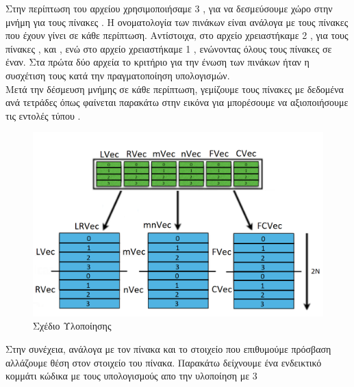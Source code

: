 \documentclass{article}
\begin{document}
Στην περίπτωση του αρχείου  χρησιμοποιήσαμε 3 , για να δεσμεύσουμε χώρο στην μνήμη για τους πίνακες . Η ονοματολογία των πινάκων είναι ανάλογα με τους πίνακες που έχουν γίνει  σε κάθε περίπτωση. Αντίστοιχα, στο αρχείο  χρειαστήκαμε 2 , για τους πίνακες , και , ενώ στο αρχείο  χρειαστήκαμε 1 , ενώνοντας όλους τους πίνακες σε έναν. Στα πρώτα δύο αρχεία το κριτήριο για την ένωση των πινάκων ήταν η συσχέτιση τους κατά την πραγματοποίηση υπολογισμών.\\

Μετά την δέσμευση μνήμης σε κάθε περίπτωση, γεμίζουμε τους πίνακες με δεδομένα ανά τετράδες όπως φαίνεται παρακάτω στην εικόνα για μπορέσουμε 
να αξιοποιήσουμε τις εντολές τύπου .
\vspace{19mm}
\begin{figure}[h!]
\centering
  \includegraphics[width=0.8\linewidth]{SCHEME.png}
  \caption{Σχέδιο Υλοποίησης}
\end{figure}
\newpage
Στην συνέχεια, ανάλογα με τον πίνακα και το στοιχείο που επιθυμούμε πρόσβαση αλλάζουμε θέση στον στοιχείο του πίνακα. Παρακάτω δείχνουμε ένα ενδεικτικό κομμάτι κώδικα με τους υπολογισμούς απο την υλοποίηση με 3 
\end{document}

